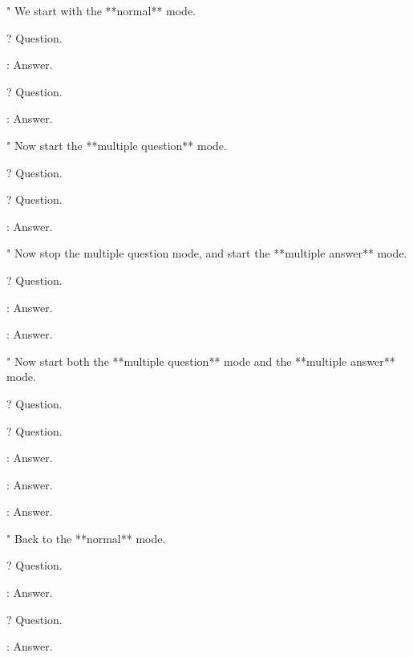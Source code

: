 "
  We start with the **normal** mode.

?
  Question.

:
  Answer.

?
  Question.

:
  Answer.

"
  Now start the **multiple question** mode.

\EnableMultipleQuestion

?
  Question.

?
  Question.

:
  Answer.

"
  Now stop the multiple question mode, and start the **multiple answer** mode.

\DisableMultipleQuestion

\EnableMultipleAnswer

?
  Question.

:
  Answer.

:
  Answer.

"
  Now start both the **multiple question** mode and the **multiple answer** mode.

\EnableMultipleQuestion

\EnableMultipleAnswer

?
  Question.

?
  Question.

:
  Answer.

:
  Answer.

:
  Answer.

"
  Back to the **normal** mode.

\DisableMultipleQuestion

\DisableMultipleAnswer

?
  Question.

:
  Answer.

?
  Question.

:
  Answer.
